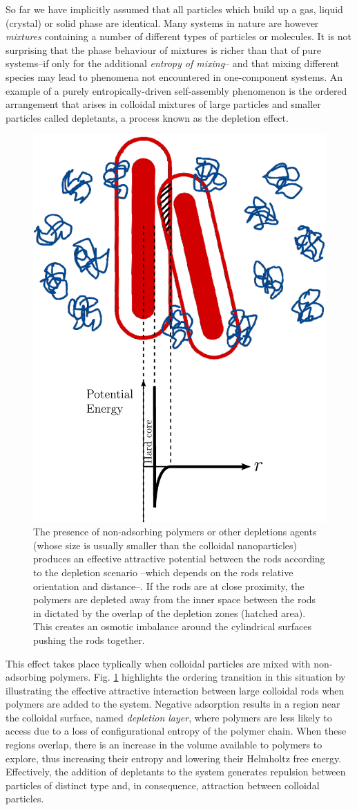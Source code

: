So far we have implicitly assumed that all particles which build up a gas, liquid (crystal) or solid phase are identical. Many systems in nature are however {\em mixtures} containing a number of different types of particles or molecules. It is not surprising that the phase behaviour of mixtures is richer than that of pure systems--if only for the additional {\em entropy of mixing}-- and that mixing different species may lead to  phenomena not encountered in one-component systems. An example of a purely entropically-driven self-assembly phenomenon is the ordered arrangement that arises in colloidal mixtures of large particles and smaller particles called depletants, a process known as the depletion effect.

\begin{figure}
\includegraphics[width= 0.4 \columnwidth]{figures/chapter-1/depletion}
\caption{ \label{introfig2} The presence of non-adsorbing polymers or other depletions agents (whose size is usually smaller than the colloidal nanoparticles) produces an effective attractive potential between the rods according to the depletion scenario --which depends on the rods relative orientation and distance--. If the rods are at close proximity, the polymers are depleted away from the inner space between the rods in dictated by the overlap of the depletion zones (hatched area). This creates an osmotic imbalance around the cylindrical surfaces pushing the rods together.  }
\end{figure}

This effect takes place typlically when colloidal particles are mixed with non-adsorbing polymers. Fig. \ref{introfig2} highlights the ordering transition in this situation by illustrating the effective attractive interaction between large colloidal rods when polymers are added to the system. Negative adsorption results in a region near the colloidal surface, named {\em depletion layer}, where polymers are less likely to access due to a loss of configurational entropy of the polymer chain. When these regions overlap, there is an increase in the volume available to polymers to explore, thus increasing their entropy and lowering their Helmholtz free energy. Effectively, the addition of depletants to the system generates repulsion between particles of distinct type and, in consequence, attraction between colloidal particles.

